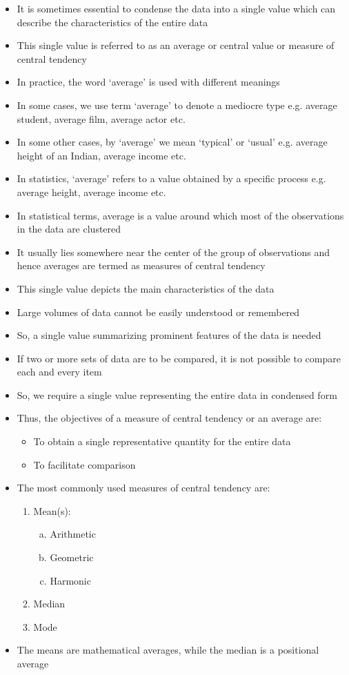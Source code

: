 \documentclass[
10pt, %
a4paper, %
]{report}
\begin{document}
\begin{itemize}
\item It is sometimes essential to condense
the data into a single value which can describe
the characteristics of the entire data
\item This single value is referred to as an average or central value or measure of central tendency
\item In practice, the word ‘average’ is used with different meanings
\item In some cases, we use term ‘average’ to denote a mediocre type e.g. average student, average film, average actor etc.
\item In some other cases, by ‘average’ we mean
‘typical’ or ‘usual’ e.g. average height of an
Indian, average income etc.
\item In statistics, ‘average’ refers to a value obtained by a specific process e.g. average height, average income etc.
\item In statistical terms, average is a value around which most of the observations in the data are clustered
\item It usually lies somewhere near the center of the group of observations and hence averages are termed as measures of central tendency
\item This single value depicts the main characteristics of the data
\item Large volumes of data cannot be easily understood or remembered
\item So, a single value summarizing prominent features of the data is needed
\item If two or more sets of data are to be compared, it is not possible to compare each and every item
\item So, we require a single value representing the entire data in condensed form
\item Thus, the objectives of a measure of central tendency or an average are:
\begin{itemize}
\item To obtain a single representative quantity for the entire data
\item To facilitate comparison
\end{itemize}
\item The most commonly used measures of central
tendency are:
\begin{enumerate}
\item Mean(s):
\begin{enumerate}[a.]
\item Arithmetic
\item Geometric
\item Harmonic
\end{enumerate}
\item Median
\item Mode
\end{enumerate}
\item The means are mathematical averages, while the median is a positional average
\end{itemize}
\end{document}
